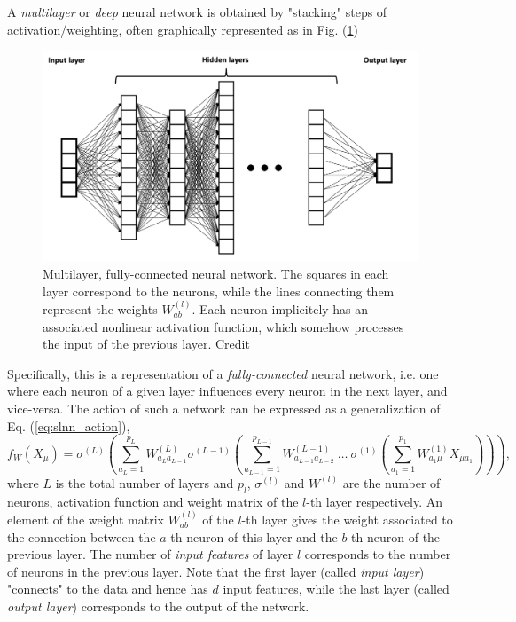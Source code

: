 \documentclass{article}
\begin{document}
A \emph{multilayer} or \emph{deep} neural network is obtained by "stacking" steps of activation/weighting, often graphically represented as in Fig. (\ref{fig:nn})
\begin{figure}[h]
    \centering
    \includegraphics[width=0.75\linewidth]{deep_nn}
    \caption{Multilayer, fully-connected neural network. The squares in each layer correspond to the neurons, while the lines connecting them represent the weights $W^{(l)}_{a b}$. Each neuron implicitely has an associated nonlinear activation function, which somehow processes the input of the previous layer. \href{https://commons.wikimedia.org/wiki/File:Example_of_a_deep_neural_network.png}{Credit}}
    \label{fig:nn}
\end{figure}
Specifically, this is a representation of a \emph{fully-connected} neural network, i.e. one where each neuron of a given layer influences every neuron in the next layer, and vice-versa. The action of such a network can be expressed as a generalization of Eq. (\ref{eq:slnn_action}),
\begin{equation}
    f_W(X_{\mu})
    =
    \sigma^{(L)}\left(
        \sum_{a_L=1}^{p_L} W^{(L)}_{a_L a_{L-1}}
        \sigma^{(L-1)}\left(
            \sum_{a_{L-1}=1}^{p_{L-1}} W^{(L-1)}_{a_{L-1} a_{L-2}}
            \ \dots \ 
            \sigma^{(1)}\left(
            \sum_{a_{1}=1}^{p_{1}} W^{(1)}_{a_{1} \mu} X_{\mu a_{1}}
            \right)
        \right)
    \right),
    \label{eq:mlnn_action}
\end{equation}
where $L$ is the total number of layers and $p_l$, $\sigma^{(l)}$ and $W^{(l)}$ are the number of neurons, activation function and weight matrix of the $l$-th layer respectively. An element of the weight matrix $W^{(l)}_{a b}$ of the $l$-th layer gives the weight associated to the connection between the $a$-th neuron of this layer and the $b$-th neuron of the previous layer. The number of \emph{input features} of layer $l$ corresponds to the number of neurons in the previous layer.
Note that the first layer (called \emph{input layer}) "connects" to the data and hence has $d$ input features, while the last layer (called \emph{output layer}) corresponds to the output of the network.
\end{document}

